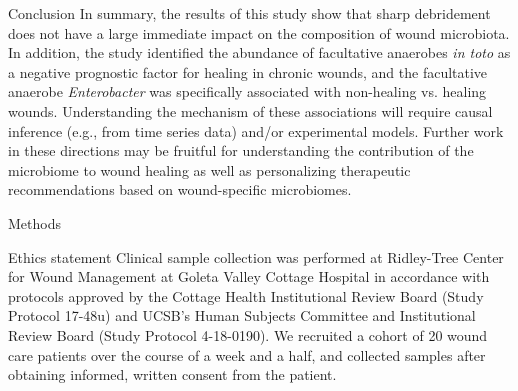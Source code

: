 \documentclass[oneside,12pt,final]{sty/ucthesis-CA2012}
\begin{document}
\begin{mainmatter}
\begin{section}{Conclusion}
In summary, the results of this study show that sharp debridement does not have a large immediate impact on the composition of wound microbiota. In addition, the study identified the abundance of facultative anaerobes \textit{in toto} as a negative prognostic factor for healing in chronic wounds, and the facultative anaerobe \textit{Enterobacter} was specifically associated with non-healing vs. healing wounds. Understanding the mechanism of these associations will require causal inference (e.g., from time series data) and/or experimental models. Further work in these directions may be fruitful for understanding the contribution of the microbiome to wound healing as well as personalizing therapeutic recommendations based on wound-specific microbiomes.
\end{section}

\begin{section}{Methods}

\begin{subsection}{Ethics statement}
Clinical sample collection was performed at Ridley-Tree Center for Wound Management at Goleta Valley Cottage Hospital in accordance with protocols approved by the Cottage Health Institutional Review Board (Study Protocol 17-48u) and UCSB's Human Subjects Committee and Institutional Review Board (Study Protocol 4-18-0190). We recruited a cohort of 20 wound care patients over the course of a week and a half, and collected samples after obtaining informed, written consent from the patient.
\end{subsection}


\end{section}
\end{mainmatter}
\end{document}
